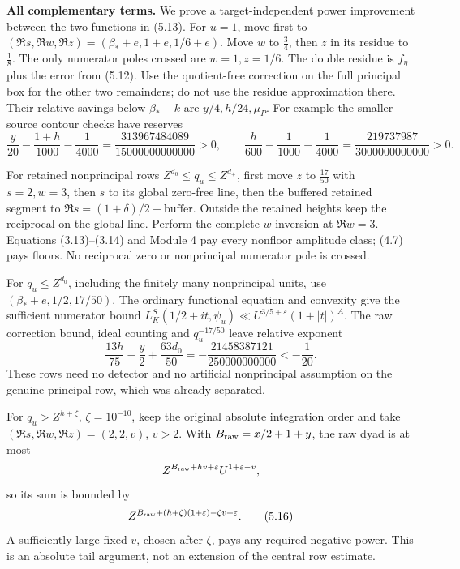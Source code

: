 \documentclass[11pt,a4paper]{article}
\begin{document}
\textbf{All complementary terms.} We prove a target-independent power
improvement between the two functions in (5.13). For \(u=1\), move first
to \((\Re s,\Re w,\Re z)=(\beta_*+e,1+e,1/6+e)\). Move \(w\) to \(\frac{3}{4}\),
then \(z\) in its residue to \(\frac{1}{8}\). The only numerator poles crossed
are \(w=1,z=1/6\). The double residue is \(f_\eta\) plus the error from
(5.12). Use the quotient-free correction on the full principal box for
the other two remainders; do not use the residue approximation there.
Their relative savings below \(\beta_*-k\) are \(y/4,h/24,\mu_P\). For
example the smaller source contour checks have reserves \[
\frac y{20}-\frac{1+h}{1000}-\frac1{4000}
 =\frac{313967484089}{15000000000000}>0,\qquad
\frac h{600}-\frac1{1000}-\frac1{4000}
 =\frac{219737987}{3000000000000}>0.
\tag{5.14}
\]

For retained nonprincipal rows \(Z^{d_0}\le q_u\le Z^{d_+}\), first move
\(z\) to \(\frac{17}{50}\) with \(s=2,w=3\), then \(s\) to its global zero-free
line, then the buffered retained segment to
\(\Re s=(1+\delta)/2+\text{buffer}\). Outside the retained heights keep
the reciprocal on the global line. Perform the complete \(w\) inversion
at \(\Re w=3\). Equations (3.13)--(3.14) and Module 4 pay every nonfloor
amplitude class; (4.7) pays floors. No reciprocal zero or nonprincipal
numerator pole is crossed.

For \(q_u\le Z^{d_0}\), including the finitely many nonprincipal units,
use \((\beta_*+e,1/2,17/50)\). The ordinary functional equation and
convexity give the sufficient numerator bound
\(L_K^S(1/2+it,\psi_u)\ll U^{3/5+\varepsilon}(1+|t|)^A\). The raw
correction bound, ideal counting and \(q_u^{-17/50}\) leave relative
exponent \[
\frac{13h}{75}-\frac y2+\frac{63d_0}{50}
=-\frac{21458387121}{250000000000}<-\frac1{20}.
\tag{5.15}
\] These rows need no detector and no artificial nonprincipal assumption
on the genuine principal row, which was already separated.

For \(q_u>Z^{h+\zeta}\), \(\zeta=10^{-10}\), keep the original absolute
integration order and take \((\Re s,\Re w,\Re z)=(2,2,v)\), \(v>2\).
With \(B_{\rm raw}=x/2+1+y\), the raw dyad is at most \[
Z^{B_{\rm raw}+hv+\varepsilon}U^{1+\varepsilon-v},
\] so its sum is bounded by \[
Z^{B_{\rm raw}+(h+\zeta)(1+\varepsilon)-\zeta v+\varepsilon}.
\tag{5.16}
\] A sufficiently large fixed \(v\), chosen after \(\zeta\), pays any
required negative power. This is an absolute tail argument, not an
extension of the central row estimate.
\end{document}
